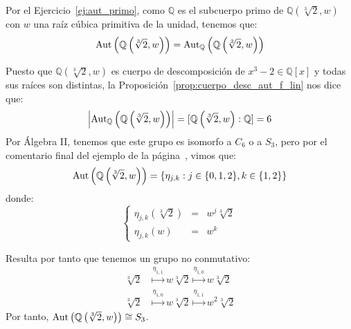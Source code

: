 \begin{ejemplo}\label{ejemplo:aut_sqrt3_2}
    Por el Ejercicio~\ref{ej:aut_primo}, como $\mathbb{Q}$ es el subcuerpo primo de $\mathbb{Q}\left(\sqrt[3]{2}, w\right)$ con $w$ una raíz cúbica primitiva de la unidad, tenemos que:
    \begin{equation*}
        \operatorname{Aut}\left(\mathbb{Q}\left(\sqrt[3]{2}, w\right)\right) = \operatorname{Aut}_\mathbb{Q}\left(\mathbb{Q}\left(\sqrt[3]{2}, w\right)\right)
    \end{equation*}
    
    Puesto que $\mathbb{Q}\left(\sqrt[3]{2}, w\right)$ es cuerpo de descomposición de $x^3-2\in \mathbb{Q}[x]$ y todas sus raíces son distintas, la Proposición~\ref{prop:cuerpo_desc_aut_f_lin} nos dice que:
    \begin{equation*}
        \left|\operatorname{Aut}_\mathbb{Q}\left(\mathbb{Q}\left(\sqrt[3]{2},w\right)\right)\right| = [\mathbb{Q}\left(\sqrt[3]{2},w\right):\mathbb{Q}] = 6
    \end{equation*}
    Por Álgebra II, tenemos que este grupo es isomorfo a $C_6$ o a $S_3$, pero por el comentario final del ejemplo de la página~\pageref{ejemplo:extension_homomorfismos}, vimos que:
    \begin{equation*}
        \operatorname{Aut}\left(\mathbb{Q}\left(\sqrt[3]{2},w\right)\right) = \{\eta_{j,k} : j \in \{0,1,2\}, k\in \{1,2\}\}
    \end{equation*}
    donde:
    \begin{equation*}
        \left\{\begin{array}{ccl}
                \eta_{j,k}\left(\sqrt[3]{2}\right) &=& w^j\sqrt[3]{2} \\
                \eta_{j,k}(w) &=& w^k
        \end{array}\right.
    \end{equation*}
    
    Resulta por tanto que tenemos un grupo no conmutativo:
    \begin{align*}
        \sqrt[3]{2} &\stackrel{\eta_{1,1}}{\longmapsto} w\sqrt[3]{2} \stackrel{\eta_{1,0}}{\longmapsto} w\sqrt[3]{2} \\
        \sqrt[3]{2} &\stackrel{\eta_{1,0}}{\longmapsto} w\sqrt[3]{2} \stackrel{\eta_{1,1}}{\longmapsto} w^2\sqrt[3]{2} 
    \end{align*}
    Por tanto, $\operatorname{Aut}\left(\mathbb{Q}\left(\sqrt[3]{2},w\right)\right)\cong S_3$.
\end{ejemplo}

